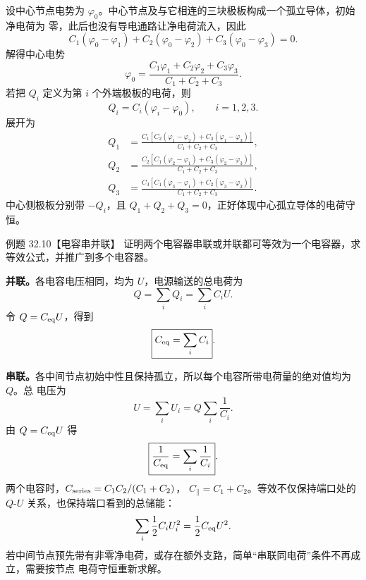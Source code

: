\begin{xesolution}
设中心节点电势为 $\varphi_0$。中心节点及与它相连的三块极板构成一个孤立导体，初始净电荷为
零，此后也没有导电通路让净电荷流入，因此
\[
  C_1(\varphi_0-\varphi_1)+C_2(\varphi_0-\varphi_2)
  +C_3(\varphi_0-\varphi_3)=0.
\]
解得中心电势
\begin{equation}
  \boxed{\varphi_0=
  \frac{C_1\varphi_1+C_2\varphi_2+C_3\varphi_3}{C_1+C_2+C_3}}.
\end{equation}
若把 $Q_i$ 定义为第 $i$ 个外端极板的电荷，则
\begin{equation}
  \boxed{Q_i=C_i(\varphi_i-\varphi_0)},\qquad i=1,2,3.
\end{equation}
展开为
\begin{align*}
  Q_1&=\frac{C_1[C_2(\varphi_1-\varphi_2)+C_3(\varphi_1-\varphi_3)]}{C_1+C_2+C_3},\\
  Q_2&=\frac{C_2[C_1(\varphi_2-\varphi_1)+C_3(\varphi_2-\varphi_3)]}{C_1+C_2+C_3},\\
  Q_3&=\frac{C_3[C_1(\varphi_3-\varphi_1)+C_2(\varphi_3-\varphi_2)]}{C_1+C_2+C_3}.
\end{align*}
中心侧极板分别带 $-Q_i$，且 $Q_1+Q_2+Q_3=0$，正好体现中心孤立导体的电荷守恒。

\starCapacitorDiagram
\end{xesolution}

\Needspace{0.34\textheight}
\begin{origexamplebox}{例题 32.10【电容串并联】}
证明两个电容器串联或并联都可等效为一个电容器，求等效公式，并推广到多个电容器。
\end{origexamplebox}

\begin{xesolution}
\textbf{并联。}各电容电压相同，均为 $U$，电源输送的总电荷为
\[
  Q=\sum_iQ_i=\sum_iC_iU.
\]
令 $Q=C_{\rm eq}U$，得到
\begin{equation}
  \boxed{C_{\rm eq}=\sum_iC_i}.
\end{equation}

\textbf{串联。}各中间节点初始中性且保持孤立，所以每个电容所带电荷量的绝对值均为 $Q$。总
电压为
\[
  U=\sum_iU_i=Q\sum_i\frac1{C_i}.
\]
由 $Q=C_{\rm eq}U$ 得
\begin{equation}
  \boxed{\frac1{C_{\rm eq}}=\sum_i\frac1{C_i}}.
\end{equation}
两个电容时，$C_{\rm series}=C_1C_2/(C_1+C_2)$，
$C_{\parallel}=C_1+C_2$。等效不仅保持端口处的 $Q$-$U$ 关系，也保持端口看到的总储能：
\[
  \sum_i\frac12C_iU_i^2=\frac12C_{\rm eq}U^2.
\]
若中间节点预先带有非零净电荷，或存在额外支路，简单“串联同电荷”条件不再成立，需要按节点
电荷守恒重新求解。
\end{xesolution}

